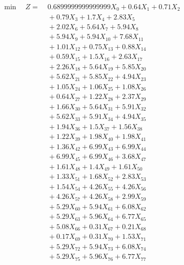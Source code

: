 \documentclass[a4paper,10pt]{article}
\begin{document}
\allowdisplaybreaks
{\small
\begin{align}
\min \quad Z = &\; 0.6899999999999999 X_{0} + 0.64 X_{1} + 0.71 X_{2} \\[0.3ex]
&\;  + 0.79 X_{3} + 1.7 X_{4} + 2.83 X_{5} \\[0.3ex]
&\;  + 2.02 X_{6} + 5.64 X_{7} + 5.94 X_{8} \\[0.3ex]
&\;  + 5.94 X_{9} + 5.94 X_{10} + 7.68 X_{11} \\[0.3ex]
&\;  + 1.01 X_{12} + 0.75 X_{13} + 0.88 X_{14} \\[0.3ex]
&\;  + 0.59 X_{15} + 1.5 X_{16} + 2.63 X_{17} \\[0.3ex]
&\;  + 2.26 X_{18} + 5.64 X_{19} + 5.85 X_{20} \\[0.3ex]
&\;  + 5.62 X_{21} + 5.85 X_{22} + 4.94 X_{23} \\[0.3ex]
&\;  + 1.05 X_{24} + 1.06 X_{25} + 1.08 X_{26} \\[0.3ex]
&\;  + 0.64 X_{27} + 1.22 X_{28} + 2.37 X_{29} \\[0.5ex]\allowbreak
&\;  + 1.66 X_{30} + 5.64 X_{31} + 5.91 X_{32} \\[0.3ex]
&\;  + 5.62 X_{33} + 5.91 X_{34} + 4.94 X_{35} \\[0.3ex]
&\;  + 1.94 X_{36} + 1.5 X_{37} + 1.56 X_{38} \\[0.3ex]
&\;  + 1.22 X_{39} + 1.98 X_{40} + 1.98 X_{41} \\[0.3ex]
&\;  + 1.36 X_{42} + 6.99 X_{43} + 6.99 X_{44} \\[0.3ex]
&\;  + 6.99 X_{45} + 6.99 X_{46} + 3.68 X_{47} \\[0.3ex]
&\;  + 1.61 X_{48} + 1.4 X_{49} + 1.61 X_{50} \\[0.3ex]
&\;  + 1.33 X_{51} + 1.68 X_{52} + 2.83 X_{53} \\[0.3ex]
&\;  + 1.54 X_{54} + 4.26 X_{55} + 4.26 X_{56} \\[0.3ex]
&\;  + 4.26 X_{57} + 4.26 X_{58} + 2.99 X_{59} \\[0.5ex]\allowbreak
&\;  + 5.29 X_{60} + 5.94 X_{61} + 6.08 X_{62} \\[0.3ex]
&\;  + 5.29 X_{63} + 5.96 X_{64} + 6.77 X_{65} \\[0.3ex]
&\;  + 5.08 X_{66} + 0.31 X_{67} + 0.21 X_{68} \\[0.3ex]
&\;  + 0.17 X_{69} + 0.31 X_{70} + 1.53 X_{71} \\[0.3ex]
&\;  + 5.29 X_{72} + 5.94 X_{73} + 6.08 X_{74} \\[0.3ex]
&\;  + 5.29 X_{75} + 5.96 X_{76} + 6.77 X_{77} \\[0.3ex]

\end{align}}
\end{document}
